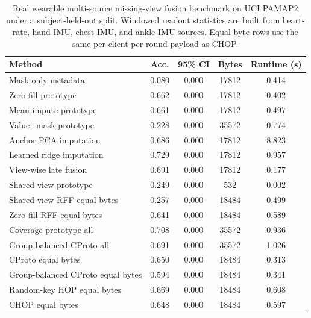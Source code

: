 \begin{table}[t]
\centering
\caption{Real wearable multi-source missing-view fusion benchmark on UCI PAMAP2 under a subject-held-out split. Windowed readout statistics are built from heart-rate, hand IMU, chest IMU, and ankle IMU sources. Equal-byte rows use the same per-client per-round payload as CHOP.}
\label{tab:if-pamap2-fusion}
\scriptsize
\setlength{\tabcolsep}{3pt}
\renewcommand{\arraystretch}{0.94}
\begin{tabular}{lcccc}
\toprule
Method & Acc. & 95\% CI & Bytes & Runtime (s) \\
\midrule
Mask-only metadata & 0.080 & 0.000 & 17812 & 0.414 \\
Zero-fill prototype & 0.662 & 0.000 & 17812 & 0.402 \\
Mean-impute prototype & 0.661 & 0.000 & 17812 & 0.497 \\
Value+mask prototype & 0.228 & 0.000 & 35572 & 0.774 \\
Anchor PCA imputation & 0.686 & 0.000 & 17812 & 8.823 \\
Learned ridge imputation & 0.729 & 0.000 & 17812 & 0.957 \\
View-wise late fusion & 0.691 & 0.000 & 17812 & 0.177 \\
Shared-view prototype & 0.249 & 0.000 & 532 & 0.002 \\
Shared-view RFF equal bytes & 0.257 & 0.000 & 18484 & 0.499 \\
Zero-fill RFF equal bytes & 0.641 & 0.000 & 18484 & 0.589 \\
Coverage prototype all & 0.708 & 0.000 & 35572 & 0.936 \\
Group-balanced CProto all & 0.691 & 0.000 & 35572 & 1.026 \\
CProto equal bytes & 0.650 & 0.000 & 18484 & 0.313 \\
Group-balanced CProto equal bytes & 0.594 & 0.000 & 18484 & 0.341 \\
Random-key HOP equal bytes & 0.669 & 0.000 & 18484 & 0.608 \\
CHOP equal bytes & 0.648 & 0.000 & 18484 & 0.597 \\
\bottomrule
\end{tabular}
\end{table}
